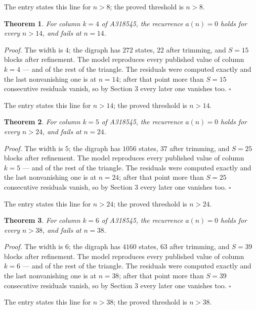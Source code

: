 \documentclass[11pt]{article}
\newtheorem{theorem}{Theorem}
\theoremstyle{definition}
\begin{document}
The entry states this line for $n > 8$; the proved threshold is $n > 8$.

\begin{theorem} For column $k = 4$ of A318545, the recurrence $a(n) = 0$ holds for every $n > 14$, and fails at $n = 14$.\end{theorem}

{\itshape Proof.} The width is $4$; the digraph has $272$ states, $22$ after trimming, and $S = 15$ blocks after refinement. The model reproduces every published value of column $k = 4$ --- and of the rest of the triangle. The residuals were computed exactly and the last nonvanishing one is at $n = 14$; after that point more than $S = 15$ consecutive residuals vanish, so by Section 3 every later one vanishes too. $\square$

The entry states this line for $n > 14$; the proved threshold is $n > 14$.

\begin{theorem} For column $k = 5$ of A318545, the recurrence $a(n) = 0$ holds for every $n > 24$, and fails at $n = 24$.\end{theorem}

{\itshape Proof.} The width is $5$; the digraph has $1056$ states, $37$ after trimming, and $S = 25$ blocks after refinement. The model reproduces every published value of column $k = 5$ --- and of the rest of the triangle. The residuals were computed exactly and the last nonvanishing one is at $n = 24$; after that point more than $S = 25$ consecutive residuals vanish, so by Section 3 every later one vanishes too. $\square$

The entry states this line for $n > 24$; the proved threshold is $n > 24$.

\begin{theorem} For column $k = 6$ of A318545, the recurrence $a(n) = 0$ holds for every $n > 38$, and fails at $n = 38$.\end{theorem}

{\itshape Proof.} The width is $6$; the digraph has $4160$ states, $63$ after trimming, and $S = 39$ blocks after refinement. The model reproduces every published value of column $k = 6$ --- and of the rest of the triangle. The residuals were computed exactly and the last nonvanishing one is at $n = 38$; after that point more than $S = 39$ consecutive residuals vanish, so by Section 3 every later one vanishes too. $\square$

The entry states this line for $n > 38$; the proved threshold is $n > 38$.
\end{document}
